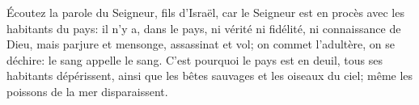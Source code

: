 Écoutez la parole du Seigneur, fils d’Israël,
	car le Seigneur est en procès avec les habitants du pays:
	il n’y a, dans le pays, ni vérité ni fidélité, ni connaissance de Dieu,
	mais parjure et mensonge, assassinat et vol;
	on commet l’adultère, on se déchire:
	le sang appelle le sang.
C’est pourquoi le pays est en deuil, tous ses habitants dépérissent,
	ainsi que les bêtes sauvages et les oiseaux du ciel;
	même les poissons de la mer disparaissent.
